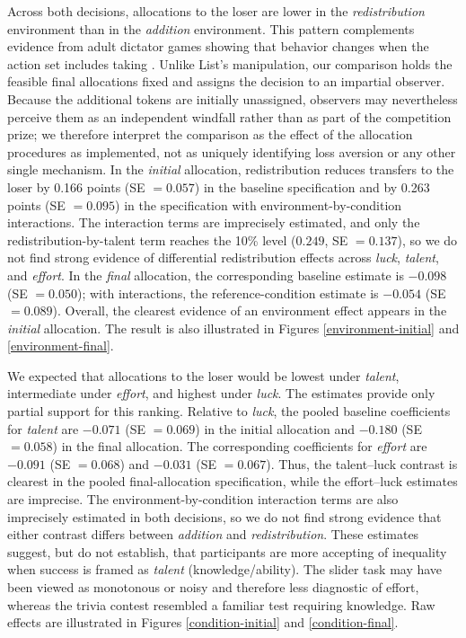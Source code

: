 \documentclass[11pt]{article}
\begin{document}
Across both decisions, allocations to the loser are lower in the \emph{redistribution} environment than in the \emph{addition} environment. This pattern complements evidence from adult dictator games showing that behavior changes when the action set includes taking \citep{list2007interpretation}. Unlike List's manipulation, our comparison holds the feasible final allocations fixed and assigns the decision to an impartial observer. Because the additional tokens are initially unassigned, observers may nevertheless perceive them as an independent windfall rather than as part of the competition prize; we therefore interpret the comparison as the effect of the allocation procedures as implemented, not as uniquely identifying loss aversion or any other single mechanism. In the \emph{initial} allocation, redistribution reduces transfers to the loser by 0.166 points (SE $=0.057$) in the baseline specification and by 0.263 points (SE $=0.095$) in the specification with environment-by-condition interactions. The interaction terms are imprecisely estimated, and only the redistribution-by-talent term reaches the 10\% level ($0.249$, SE $=0.137$), so we do not find strong evidence of differential redistribution effects across \emph{luck}, \emph{talent}, and \emph{effort}. In the \emph{final} allocation, the corresponding baseline estimate is $-0.098$ (SE $=0.050$); with interactions, the reference-condition estimate is $-0.054$ (SE $=0.089$). Overall, the clearest evidence of an environment effect appears in the \emph{initial} allocation. The result is also illustrated in Figures \ref{environment-initial} and \ref{environment-final}.



We expected that allocations to the loser would be lowest under \emph{talent}, intermediate under \emph{effort}, and highest under \emph{luck}. The estimates provide only partial support for this ranking. Relative to \emph{luck}, the pooled baseline coefficients for \emph{talent} are $-0.071$ (SE $=0.069$) in the initial allocation and $-0.180$ (SE $=0.058$) in the final allocation. The corresponding coefficients for \emph{effort} are $-0.091$ (SE $=0.068$) and $-0.031$ (SE $=0.067$). Thus, the talent--luck contrast is clearest in the pooled final-allocation specification, while the effort--luck estimates are imprecise. The environment-by-condition interaction terms are also imprecisely estimated in both decisions, so we do not find strong evidence that either contrast differs between \emph{addition} and \emph{redistribution}. These estimates suggest, but do not establish, that participants are more accepting of inequality when success is framed as \emph{talent} (knowledge/ability). The slider task may have been viewed as monotonous or noisy and therefore less diagnostic of effort, whereas the trivia contest resembled a familiar test requiring knowledge. Raw effects are illustrated in Figures \ref{condition-initial} and \ref{condition-final}.
\end{document}
